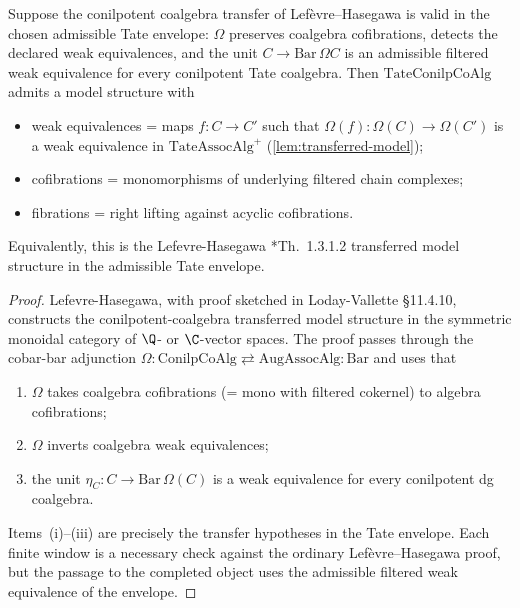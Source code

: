 \begin{lem}\label{lem:tate-conilp-model}
  Suppose the conilpotent coalgebra transfer of
  Lef\`evre--Hasegawa is valid in the chosen admissible Tate envelope:
  \(\Omega\) preserves coalgebra cofibrations, detects the declared
  weak equivalences, and the unit
  \(C\to\mathrm{Bar}\,\Omega C\) is an admissible filtered weak
  equivalence for every conilpotent Tate coalgebra.  Then
  $\mathrm{TateConilpCoAlg}$ admits a model structure with
  \begin{itemize}
    \item weak equivalences = maps $f\colon C\to C'$ such that
      $\Omega(f)\colon\Omega(C)\to\Omega(C')$ is a weak
      equivalence in $\mathrm{TateAssocAlg}^+$
      (\ref{lem:transferred-model});
    \item cofibrations = monomorphisms of underlying filtered
      chain complexes;
    \item fibrations = right lifting against acyclic cofibrations.
  \end{itemize}
  Equivalently, this is the Lefevre-Hasegawa
  \cite{lefevre-hasegawa}*{Th.~1.3.1.2} transferred model structure
  in the admissible Tate envelope.
\end{lem}

\begin{proof}
  Lefevre-Hasegawa, with proof sketched in Loday-Vallette
  \S 11.4.10, constructs the conilpotent-coalgebra transferred
  model structure in the symmetric monoidal category of $\Q$- or
  $\C$-vector spaces. The proof passes through the cobar-bar
  adjunction $\Omega\colon\mathrm{ConilpCoAlg}\rightleftarrows
  \mathrm{AugAssocAlg}\colon\mathrm{Bar}$ and uses that
  \begin{enumerate}[label=(\roman*)]
    \item $\Omega$ takes coalgebra cofibrations (= mono with
      filtered cokernel) to algebra cofibrations;
    \item $\Omega$ inverts coalgebra weak equivalences;
    \item the unit $\eta_C\colon C\to\mathrm{Bar}\,\Omega(C)$ is a
      weak equivalence for every conilpotent dg coalgebra.
  \end{enumerate}
  Items~(i)--(iii) are precisely the transfer hypotheses in the Tate
  envelope.  Each finite window is a necessary check against the
  ordinary Lef\`evre--Hasegawa proof, but the passage to the completed
  object uses the admissible filtered weak equivalence of the envelope.
\end{proof}

